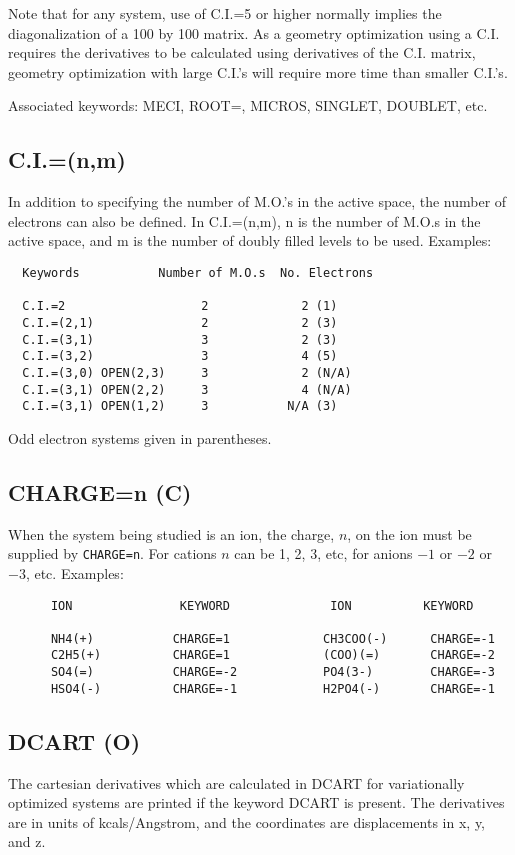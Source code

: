 \documentclass[a4paper]{book}
\newcommand{\mi}[1]{#1\index{#1}}
\begin{document}
    Note that for any system, use of C.I.=5 or higher  normally  implies
the  diagonalization  of a 100 by 100 matrix.  As a geometry optimization
using a C.I. requires the derivatives to be calculated using  derivatives
of  the C.I. matrix, geometry optimization with large C.I.'s will require
more time than smaller C.I.'s.

Associated keywords:  MECI, ROOT=, MICROS, SINGLET, DOUBLET, etc.
                                          
\subsection*{C.I.=(n,m)}
    In addition to specifying the number of M.O.'s in the active  space,
the  number  of  electrons  can also be defined.  In C.I.=(n,m), n is the
number of M.O.s in the active space, and m is the number of doubly filled
levels to be used.
Examples:
\begin{verbatim}
  Keywords           Number of M.O.s  No. Electrons

  C.I.=2                   2             2 (1)
  C.I.=(2,1)               2             2 (3)
  C.I.=(3,1)               3             2 (3)
  C.I.=(3,2)               3             4 (5)
  C.I.=(3,0) OPEN(2,3)     3             2 (N/A)
  C.I.=(3,1) OPEN(2,2)     3             4 (N/A)
  C.I.=(3,1) OPEN(1,2)     3           N/A (3)
\end{verbatim}
Odd electron systems given in parentheses.

\subsection*{CHARGE=n (C)}
 When the system being studied is an ion, the charge, $n$, on  the  ion
 must be supplied by \verb/CHARGE=n/.  For cations $n$ can be 1, 2, 3, etc, 
 for anions $-1$ or $-2$ or $-3$, etc.
 Examples:
\begin{verbatim}
      ION               KEYWORD              ION          KEYWORD

      NH4(+)           CHARGE=1             CH3COO(-)      CHARGE=-1
      C2H5(+)          CHARGE=1             (COO)(=)       CHARGE=-2
      SO4(=)           CHARGE=-2            PO4(3-)        CHARGE=-3
      HSO4(-)          CHARGE=-1            H2PO4(-)       CHARGE=-1
\end{verbatim}

\subsection*{DCART (O)}
 The  cartesian  derivatives  which  are  calculated  in \mi{DCART}   for
 variationally  optimized  systems  are  printed  if  the keyword DCART is
 present.  The  derivatives  are  in  units  of  kcals/Angstrom,  and  the
 coordinates are displacements in x, y, and z.
\end{document}
